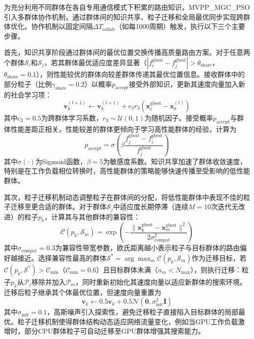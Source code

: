 为充分利用不同群体在各自专用通信模式下积累的路由知识，MVPP\_MGC\_PSO引入多群体协作机制，通过群体间的知识共享、粒子迁移和全局最优同步实现跨群体优化。协作机制以固定间隔$\Delta T_{\text{collab}}$（如每1000周期）触发，执行以下三个主要步骤。

首先，知识共享阶段通过群体间的最优位置交换传播高质量路由方案。对于任意两个群体$\mathcal{S}_i$和$\mathcal{S}_j$，若其群体最优适应度差异显著（$|f_i^{\text{gbest}} - f_j^{\text{gbest}}| > \theta_{\text{share}}$，$\theta_{\text{share}} = 0.1$），则性能较优的群体向较差群体传递其最优位置信息。接收群体中的部分粒子（比例$\gamma_{\text{share}} = 0.2$）以概率$p_{\text{accept}}$接受外部知识，更新其速度向量加入新的社会学习项：
\begin{equation}
\mathbf{v}_k^{(t+1)} \leftarrow \mathbf{v}_k^{(t+1)} + c_3 r_3 (\mathbf{x}_i^{\text{gbest}} - \mathbf{x}_k^{(t)})
\end{equation}
其中$c_3 = 0.5$为跨群体学习系数，$r_3 \sim \mathcal{U}(0, 1)$为随机因子。接受概率$p_{\text{accept}}$与群体性能差距正相关，性能较差的群体更倾向于学习高性能群体的经验，计算为
\begin{equation}
p_{\text{accept}} = \sigma\left(\beta \frac{f_j^{\text{gbest}} - f_i^{\text{gbest}}}{f_j^{\text{gbest}}}\right)
\end{equation}
其中$\sigma(\cdot)$为Sigmoid函数，$\beta = 5$为敏感度系数。知识共享加速了群体收敛速度，特别是在工作负载相位转换时，高性能群体的策略能够快速传播至受影响的低性能群体。

其次，粒子迁移机制动态调整粒子在群体间的分配，将低性能群体中表现不佳的粒子迁移至更合适的群体。对于群体$\mathcal{S}_j$中适应度长期停滞（连续$M = 10$次迭代无改进）的粒子$p_k$，计算其与其他群体的兼容性：
\begin{equation}
\mathcal{C}(p_k, \mathcal{S}_m) = \exp\left(-\frac{\|\mathbf{x}_k^{\text{pbest}} - \mathbf{x}_m^{\text{gbest}}\|^2}{2\sigma_{\text{compat}}^2}\right)
\end{equation}
其中$\sigma_{\text{compat}} = 0.3$为兼容性带宽参数，欧氏距离越小表示粒子与目标群体的路由偏好越接近。选择兼容性最高的群体$\mathcal{S}^* = \arg\max_m \mathcal{C}(p_k, \mathcal{S}_m)$作为迁移目标，若$\mathcal{C}(p_k, \mathcal{S}^*) > \mathcal{C}_{\min}$（$\mathcal{C}_{\min} = 0.6$）且目标群体未满（$n_m < N_{\max}$），则执行迁移：粒子$p_k$从$\mathcal{P}_j$移除并加入$\mathcal{P}_m$，同时重新初始化其速度向量以适应新群体的搜索环境。迁移后粒子继承其个体最优位置，但速度向量重置为
\begin{equation}
\mathbf{v}_k \leftarrow 0.5 \mathbf{v}_k + 0.5 \mathcal{N}(\mathbf{0}, \sigma_{\text{init}}^2 \mathbf{I})
\end{equation}
其中$\sigma_{\text{init}} = 0.1$，高斯噪声引入探索性，避免迁移粒子直接陷入目标群体的局部最优。粒子迁移机制使得群体结构动态适应网络流量变化，例如当GPU工作负载激增时，部分CPU群体粒子可自动迁移至GPU群体增强其搜索能力。

